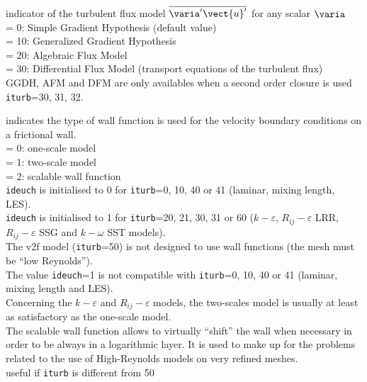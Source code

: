 {indicator of the turbulent flux model $ \overline{\varia^\prime \vect{u}^\prime}$
for any scalar $\varia$\\
\hspace*{1.3cm}= 0: Simple Gradient Hypothesis (default value)\\
\hspace*{1.3cm}= 10: Generalized Gradient Hypothesis\\
\hspace*{1.3cm}= 20: Algebraic Flux Model\\
\hspace*{1.3cm}= 30: Differential Flux Model (transport equations of the turbulent flux)\\
GGDH, AFM and DFM are only availables when a second order closure is used {\tt iturb}=30, 31, 32.
}

{indicates the type of wall function is used for
 the velocity boundary conditions on a frictional wall.\\
\hspace*{1.3cm}= 0: one-scale model\\
\hspace*{1.3cm}= 1: two-scale model\\
\hspace*{1.3cm}= 2: scalable wall function\\
{\tt ideuch} is initialised to 0 for {\tt iturb}=0, 10, 40 or 41
(laminar, mixing length, LES).\\
{\tt ideuch} is initialised to 1 for {\tt iturb}=20, 21, 30, 31 or 60
($k-\varepsilon$, $R_{ij}-\varepsilon$ LRR, $R_{ij}-\varepsilon$ SSG and
$k-\omega$ SST models).\\
The v2f model ({\tt iturb}=50) is not designed to use wall functions
(the mesh must be ``low Reynolds'').\\
The value {\tt ideuch}=1 is not compatible with {\tt iturb}=0, 10, 40
or 41 (laminar, mixing length and LES).\\
Concerning the $k-\varepsilon$ and $R_{ij}-\varepsilon$ models, the
two-scales model is usually at least as satisfactory as the one-scale
model.\\
The scalable wall function allows to virtually ``shift'' the wall when
necessary in order to be always in a logarithmic layer.
It is used to make up for
the problems related to the use of High-Reynolds models on very refined
meshes.\\
useful if {\tt iturb} is different from 50}


